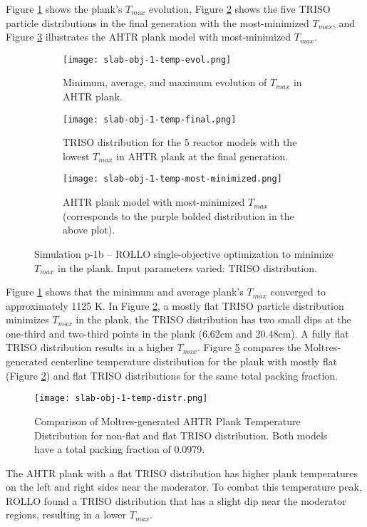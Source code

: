 Figure \ref{fig:slab-obj-1-temp-evol} shows the plank's $T_{max}$ evolution, Figure 
\ref{fig:slab-obj-1-temp-final} shows the five TRISO particle 
distributions in the final generation with the most-minimized $T_{max}$, and 
Figure \ref{fig:slab-obj-1-temp-most-minimized} illustrates the \gls{AHTR} plank model 
with most-minimized $T_{max}$. 
\begin{figure}[htbp!]
    \centering
    \begin{subfigure}{0.95\textwidth}
        \texttt{[image: slab-obj-1-temp-evol.png]}
        \caption{Minimum, average, and maximum evolution of $T_{max}$ in 
        AHTR plank.}
        \label{fig:slab-obj-1-temp-evol} 
    \end{subfigure}
    \begin{subfigure}{0.95\textwidth}
        \texttt{[image: slab-obj-1-temp-final.png]}
        \caption{TRISO distribution for the 5 reactor models with the 
        lowest $T_{max}$ in AHTR plank at the final generation.}
        \label{fig:slab-obj-1-temp-final} 
    \end{subfigure}
    \begin{subfigure}{0.95\textwidth}
        \texttt{[image: slab-obj-1-temp-most-minimized.png]}
        \caption{\gls{AHTR} plank model with most-minimized $T_{max}$
        (corresponds to the purple bolded distribution in the above plot).}
        \label{fig:slab-obj-1-temp-most-minimized} 
    \end{subfigure}
    \caption{Simulation p-1b -- ROLLO single-objective optimization to minimize $T_{max}$ 
    in the plank. Input parameters varied: TRISO distribution.}
    \label{fig:slab-obj-1-temp}
\end{figure}

Figure \ref{fig:slab-obj-1-temp-evol} shows that the minimum and average plank's 
$T_{max}$ converged to approximately 1125 K. 
In Figure \ref{fig:slab-obj-1-temp-final}, a mostly flat TRISO 
particle distribution minimizes $T_{max}$ in the plank, the TRISO distribution 
has two small dips at the one-third and two-third points in the plank (6.62cm and 20.48cm). 
A fully flat \gls{TRISO} distribution results in a higher $T_{max}$.
Figure \ref{fig:slab-obj-1-temp-distr} compares the Moltres-generated centerline 
temperature distribution for the plank with mostly flat (Figure 
\ref{fig:slab-obj-1-temp-final}) and flat TRISO distributions for the same 
total packing fraction.
\begin{figure}[htbp!]
    \centering
    \texttt{[image: slab-obj-1-temp-distr.png]}
    \caption{Comparison of Moltres-generated AHTR Plank Temperature Distribution for non-flat and flat
    TRISO distribution. Both models have a total packing fraction of 0.0979.}
    \label{fig:slab-obj-1-temp-distr}
\end{figure}
The \gls{AHTR} plank with a flat \gls{TRISO} distribution has higher plank temperatures 
on the left and right sides near the moderator. 
To combat this temperature peak, ROLLO found a \gls{TRISO} distribution that 
has a slight dip near the moderator regions, resulting in a lower $T_{max}$.

